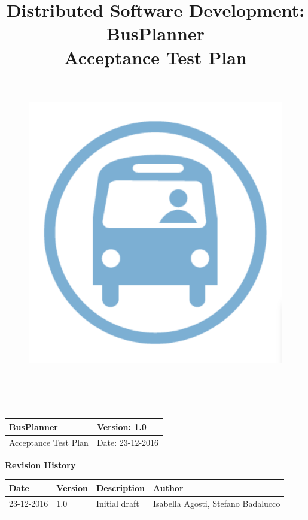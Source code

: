 \documentclass[a4paper, 12pt]{article}
\title{
	\textbf{D}istributed \textbf{S}oftware \textbf{D}evelopment: \textbf{BusPlanner}\\
	\textbf{Acceptance Test Plan}\\
	\begin{figure}[H]
		\centering
		\includegraphics[width=13cm, height=13cm]{Bus_logo}
	\end{figure}
	\date{}
}
\begin{document}
	\begin{table}[t]
		\centering
		\begin{tabular}{| m{6cm} | m{6cm} |}
			\hline
			BusPlanner & Version: 1.0\\
			\hline
			Acceptance Test Plan & Date: 23-12-2016\\
			\hline
		\end{tabular}
	\end{table}
	\maketitle 
	\begin{center}
		\textbf{\Large Revision History}
	\end{center}
	\begin{table}[h]
		\centering
		\begin{tabular}{| m{2cm} | m{2cm} | m{3cm} | m{5cm} |}
			\hline
			\textbf{Date} & \textbf{Version} & \textbf{Description} & \textbf{Author}\\
			\hline
			23-12-2016 & 1.0 & Initial draft & Isabella Agosti, Stefano Badalucco\\
			\hline
			&&&\\
			\hline
		\end{tabular}
	\end{table}
\newpage
	\tableofcontents
	
	
	
\end{document}
